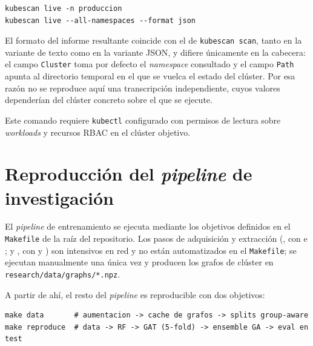{\footnotesize\begin{verbatim}
kubescan live -n produccion
kubescan live --all-namespaces --format json
\end{verbatim}}

El formato del informe resultante coincide con el de \texttt{kubescan scan},
tanto en la variante de texto como en la variante \ac{JSON}, y difiere
únicamente en la cabecera: el campo \texttt{Cluster} toma por defecto el
\textit{namespace} consultado y el campo \texttt{Path} apunta al directorio
temporal en el que se vuelca el estado del clúster. Por
esa razón no se reproduce aquí una transcripción independiente, cuyos valores
dependerían del clúster concreto sobre el que se ejecute.

Este comando requiere \texttt{kubectl} configurado con permisos de lectura
sobre \textit{workloads} y recursos \ac{RBAC} en el clúster objetivo.

\section{Reproducción del \textit{pipeline} de investigación}

El \textit{pipeline} de entrenamiento se ejecuta mediante los objetivos definidos en el
\texttt{Makefile} de la raíz del repositorio. Los pasos de adquisición y
extracción (, con
 e ; y
, con 
y ) son intensivos en red y no están automatizados en
el \texttt{Makefile}; se ejecutan manualmente una única vez y producen los
grafos de clúster en \texttt{research/data/graphs/*.npz}.

A partir de ahí, el resto del \textit{pipeline} es reproducible con dos objetivos:

{\footnotesize\begin{verbatim}
make data       # aumentacion -> cache de grafos -> splits group-aware
make reproduce  # data -> RF -> GAT (5-fold) -> ensemble GA -> eval en test
\end{verbatim}}

